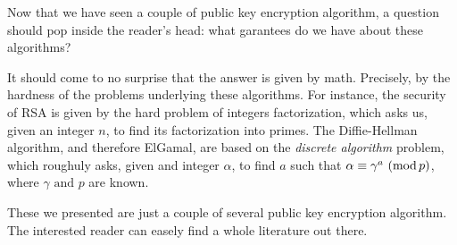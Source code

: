 \documentclass{subfiles}
\begin{document}
    Now that we have seen a couple of public key encryption algorithm,
        a question should pop inside the reader's head:
        what garantees do we have about these algorithms?
    
    It should come to no surprise that the answer is given by math.
        Precisely, by the hardness of the problems underlying these algorithms.
        For instance, the security of RSA is given by the hard problem of integers factorization,
        which asks us, given an integer \(n\), to find its factorization into primes.
        The Diffie-Hellman algorithm, and therefore ElGamal,
        are based on the \emph{discrete algorithm} problem,
        which roughuly asks, given and integer \(\alpha\), 
        to find \(a\) such that \(\alpha \equiv \gamma^{a} \mod\), where \(\gamma \text{ and } p\) are known.

    These we presented are just a couple of several public key encryption algorithm.
        The interested reader can easely find a whole literature out there.
\end{document}
